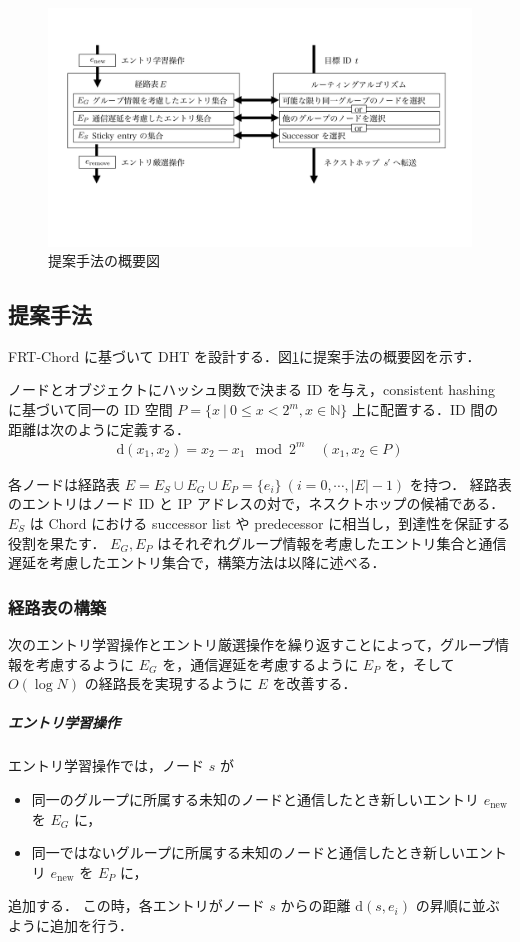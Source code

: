\documentclass[10pt, a4paper, twocolumn]{jsarticle}
\begin{document}
\begin{figure}[ht]
  \centering
  \includegraphics[width=120mm]{fig/str.pdf}
  \caption{提案手法の概要図}
  \label{fig:example}
\end{figure}

\subsection{提案手法}
FRT-Chord に基づいて DHT を設計する．図\ref{fig:example}に提案手法の概要図を示す．

ノードとオブジェクトにハッシュ関数で決まる ID を与え，consistent hashing に基づいて同一の ID 空間 $P = \{x\ |\ 0 \leq x < 2^m, x \in \mathbb{N}\}$ 上に配置する．ID 間の距離は次のように定義する．
\begin{align}
  \mathrm{d}(x_1, x_2) = x_2 - x_1 \mod 2^m \quad (x_1, x_2 \in P)
\end{align}

各ノードは経路表 $E = E_S \cup E_G \cup E_P = \{e_i\} \ (i = 0, \cdots, |E| - 1)$ を持つ．
経路表のエントリはノード ID と IP アドレスの対で，ネスクトホップの候補である．
$E_S$ は Chord における successor list や predecessor に相当し，到達性を保証する役割を果たす．
$E_G, E_P$ はそれぞれグループ情報を考慮したエントリ集合と通信遅延を考慮したエントリ集合で，構築方法は以降に述べる．

\subsubsection{経路表の構築}
次のエントリ学習操作とエントリ厳選操作を繰り返すことによって，グループ情報を考慮するように $E_G$ を，通信遅延を考慮するように $E_P$ を，そして $O(\log N)$ の経路長を実現するように $E$ を改善する．

\subparagraph{エントリ学習操作}
エントリ学習操作では，ノード $s$ が
\begin{itemize}
  \item 同一のグループに所属する未知のノードと通信したとき新しいエントリ $e_{\mathrm{new}}$ を $E_G$ に，
  \item 同一ではないグループに所属する未知のノードと通信したとき新しいエントリ $e_{\mathrm{new}}$ を $E_P$ に，
\end{itemize}
追加する．
この時，各エントリがノード $s$ からの距離 $\mathrm{d}(s, e_i)$ の昇順に並ぶように追加を行う．
\end{document}
